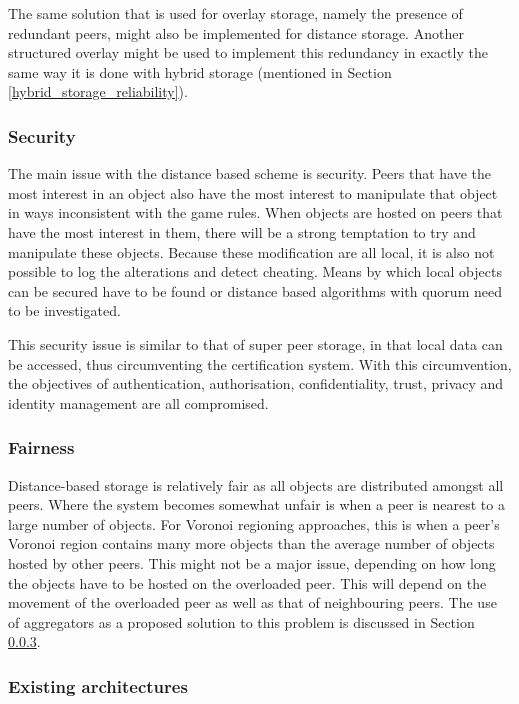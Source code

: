 The same solution that is used for overlay storage, namely the presence of redundant peers, might also be implemented for distance storage. Another structured overlay might be used to implement this redundancy in exactly the same way it is done with hybrid storage (mentioned in Section \ref{hybrid_storage_reliability}).

\subsubsection{Security}
\label{distance_based_storage_security}

The main issue with the distance based scheme is security. Peers that have the most interest in an object also have the most interest to manipulate that object in ways inconsistent with the game rules. When objects are hosted on peers that have the most interest in them, there will be a strong temptation to try and manipulate these objects. Because these modification are all local, it is also not possible to log the alterations and detect cheating. Means by which local objects can be secured have to be found or distance based algorithms with quorum need to be investigated.

This security issue is similar to that of super peer storage, in that local data can be accessed, thus circumventing the certification system. With this circumvention, the objectives of authentication, authorisation, confidentiality, trust, privacy and identity management are all compromised.

\subsubsection{Fairness}

Distance-based storage is relatively fair as all objects are distributed amongst all peers. Where the system becomes somewhat unfair is when a peer is nearest to a large number of objects. For Voronoi regioning approaches, this is when a peer's Voronoi region contains many more objects than the average number of objects hosted by other peers. This might not be a major issue, depending on how long the objects have to be hosted on the overloaded peer. This will depend on the movement of the overloaded peer as well as that of neighbouring peers. The use of aggregators as a proposed solution to this problem is discussed in Section \ref{distance_based_existing_archs}.

\subsubsection{Existing architectures}
\label{distance_based_existing_archs}

